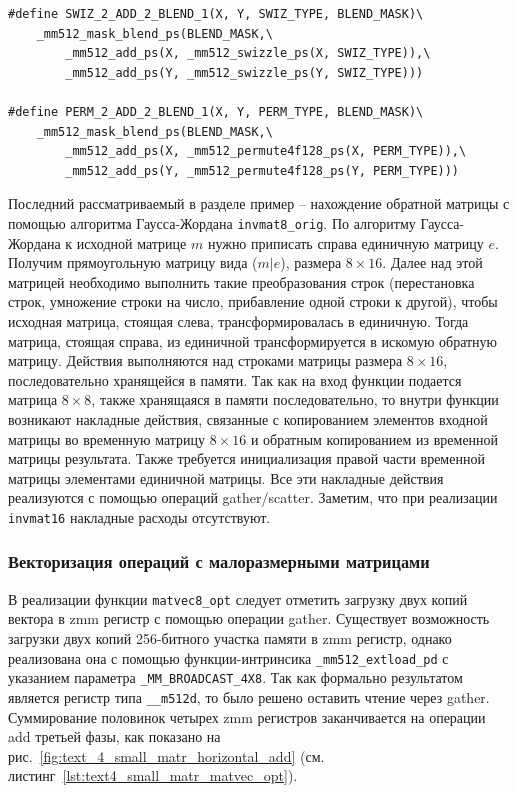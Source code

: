 \begin{singlespace}
\begin{lstlisting}[caption={Определение макросов для реализации фаз суммирования элементов векторов.}, label={lst:text_4_small_matr_swiz_macro}]
#define SWIZ_2_ADD_2_BLEND_1(X, Y, SWIZ_TYPE, BLEND_MASK)\
    _mm512_mask_blend_ps(BLEND_MASK,\
        _mm512_add_ps(X, _mm512_swizzle_ps(X, SWIZ_TYPE)),\
        _mm512_add_ps(Y, _mm512_swizzle_ps(Y, SWIZ_TYPE)))

#define PERM_2_ADD_2_BLEND_1(X, Y, PERM_TYPE, BLEND_MASK)\
    _mm512_mask_blend_ps(BLEND_MASK,\
        _mm512_add_ps(X, _mm512_permute4f128_ps(X, PERM_TYPE)),\
        _mm512_add_ps(Y, _mm512_permute4f128_ps(Y, PERM_TYPE)))
\end{lstlisting}
\end{singlespace}

Последний рассматриваемый в разделе пример -- нахождение обратной матрицы с помощью алгоритма Гаусса-Жордана \texttt{invmat8\_orig}.
По алгоритму Гаусса-Жордана к исходной матрице $m$ нужно приписать справа единичную матрицу $e$.
Получим прямоугольную матрицу вида ($m|e$), размера $8 \times 16$.
Далее над этой матрицей необходимо выполнить такие преобразования строк (перестановка строк, умножение строки на число, прибавление одной строки к другой), чтобы исходная матрица, стоящая слева, трансформировалась в единичную.
Тогда матрица, стоящая справа, из единичной трансформируется в искомую обратную матрицу.
Действия выполняются над строками матрицы размера $8 \times 16$, последовательно хранящейся в памяти.
Так как на вход функции подается матрица $8 \times 8$, также хранящаяся в памяти последовательно, то внутри функции возникают накладные действия, связанные с копированием элементов входной матрицы во временную матрицу $8 \times 16$ и обратным копированием из временной матрицы результата.
Также требуется инициализация правой части временной матрицы элементами единичной матрицы.
Все эти накладные действия реализуются с помощью операций gather/scatter.
Заметим, что при реализации \texttt{invmat16} накладные расходы отсутствуют.

\subsubsection{Векторизация операций с малоразмерными \mbox{матрицами}}\label{sec:text_4_small_matr_realization}

В реализации функции \texttt{matvec8\_opt} следует отметить загрузку двух копий вектора в zmm регистр с помощью операции gather.
Существует возможность загрузки двух копий 256-битного участка памяти в zmm регистр, однако реализована она с помощью функции-интринсика \texttt{\_mm512\_extload\_pd} с указанием параметра \texttt{\_MM\_BROADCAST\_4X8}.
Так как формально результатом является регистр типа \texttt{\_\_m512d}, то было решено оставить чтение через gather.
Суммирование половинок четырех zmm регистров заканчивается на операции add третьей фазы, как показано на рис.~\ref{fig:text_4_small_matr_horizontal_add} (см. листинг~\ref{lst:text4_small_matr_matvec_opt}).

